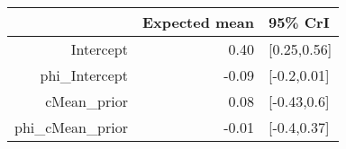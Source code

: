\begin{tabular}{rrl}
  \hline
 & Expected mean & 95\% CrI \\ 
  \hline
Intercept & 0.40 & [0.25,0.56] \\ 
  phi\_Intercept & -0.09 & [-0.2,0.01] \\ 
  cMean\_prior & 0.08 & [-0.43,0.6] \\ 
  phi\_cMean\_prior & -0.01 & [-0.4,0.37] \\ 
   \hline
\end{tabular}

